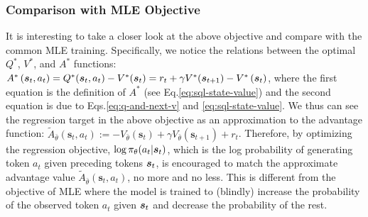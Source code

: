 \subsubsection{Comparison with MLE Objective}
\label{comparison-with-mle-objective}
It is interesting to take a closer look at the above objective and compare with the common MLE training. 
Specifically, we notice the relations between the optimal $Q^*$, $V^*$, and $A^*$ functions: $A^*\left(\bm{s}_{t}, a_{t}\right) = Q^*(\bm{s}_t, a_t) - V^*(\bm{s}_t) = r_t + \gamma V^*(\bm{s}_{t+1}) -V^*\left(\bm{s}_{t}\right)$, where the first equation is the definition of $A^*$ (see Eq.\ref{eq:sql-state-value}) and the second equation is due to Eqs.\eqref{eq:q-and-next-v} and \eqref{eq:sql-state-value}. We thus can see the regression target in the above objective as an approximation to the advantage function: $\tilde{A}_{\bar{{\theta}}}\left(\bm{s}_{t}, a_{t}\right) := -V_{\bar{{\theta}}}\left(\bm{s}_{t}\right)+ \gamma V_{\bar{{\theta}}}\left(\bm{s}_{t+1}\right)+r_{t}$. Therefore, by optimizing the regression objective, $\log \pi_\theta(a_t|\bm{s}_t)$, which is the log probability of generating token $a_t$ given preceding tokens $\bm{s}_t$, is encouraged to match the approximate advantage value $\tilde{A}_{\bar{{\theta}}}\left(\bm{s}_{t}, a_{t}\right)$, no more and no less. This is different from the objective of MLE where the model is trained to (blindly) increase the probability of the observed token $a_t$ given $\bm{s}_t$ and decrease the probability of the rest.



